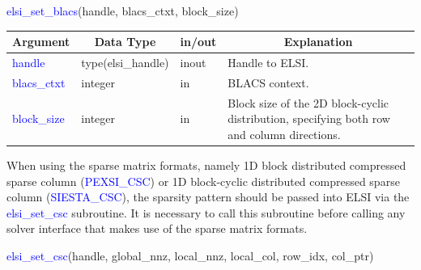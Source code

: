 \documentclass{report}
\begin{document}
\begin{labeling}{\hspace{6cm}}
\item [\hspace{0.3cm} \textcolor{blue}{elsi\_set\_blacs}(handle, blacs\_ctxt, block\_size)]
\end{labeling}

\begin{tabular}[]{|p{30mm}|p{30mm}|p{15mm}|p{90mm}|}
\hline
\multicolumn{1}{|c|}{\textbf{Argument}} & \multicolumn{1}{c|}{\textbf{Data Type}} & \multicolumn{1}{c|}{\textbf{in/out}} & \multicolumn{1}{c|}{\textbf{Explanation}}\\
\hline
\textcolor{blue}{handle}      & type(elsi\_handle) & inout & Handle to ELSI.\\
\hline
\textcolor{blue}{blacs\_ctxt} & integer            & in    & BLACS context.\\
\hline
\textcolor{blue}{block\_size} & integer            & in    & Block size of the 2D block-cyclic distribution, specifying both row and column directions. \\
\hline
\end{tabular}

\bigskip
When using the sparse matrix formats, namely 1D block distributed compressed sparse column (\textcolor{blue}{PEXSI\_CSC}) or 1D block-cyclic distributed compressed sparse column (\textcolor{blue}{SIESTA\_CSC}), the sparsity pattern should be passed into ELSI via the \textcolor{blue}{elsi\_set\_csc} subroutine.  It is necessary to call this subroutine before calling any solver interface that makes use of the sparse matrix formats.\\

\newpage
\begin{labeling}{\hspace{6cm}}
\item [\hspace{0.3cm} \textcolor{blue}{elsi\_set\_csc}(handle, global\_nnz, local\_nnz, local\_col, row\_idx, col\_ptr)]
\end{labeling}
\end{document}

